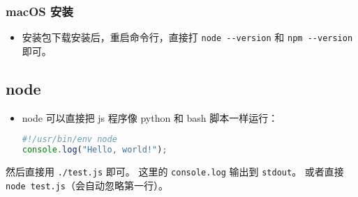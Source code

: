 \subsubsection{macOS 安装}
\begin{itemize}
\item 安装包下载安装后，重启命令行，直接打 \verb`node --version` 和 \verb`npm --version` 即可。
\end{itemize}

\subsection{node}
\begin{itemize}
\item node 可以直接把 js 程序像 python 和 bash 脚本一样运行：
\begin{lstlisting}[language=js,caption=test.js]
#!/usr/bin/env node
console.log("Hello, world!");
\end{lstlisting}
\end{itemize}
然后直接用 \verb`./test.js` 即可。 这里的 \verb`console.log` 输出到 \verb`stdout`。 或者直接 \verb`node test.js`（会自动忽略第一行）。

